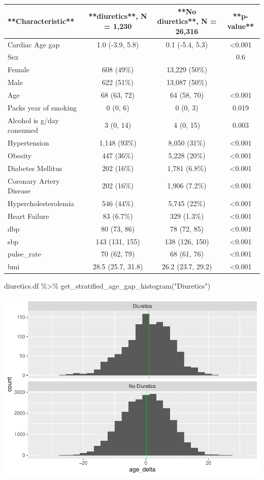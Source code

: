 \documentclass[
]{article}
\newenvironment{Shaded}{\begin{snugshade}}{\end{snugshade}}
\newcommand{\FunctionTok}[1]{\textcolor[rgb]{0.00,0.00,0.00}{#1}}
\newcommand{\NormalTok}[1]{#1}
\newcommand{\SpecialCharTok}[1]{\textcolor[rgb]{0.00,0.00,0.00}{#1}}
\newcommand{\StringTok}[1]{\textcolor[rgb]{0.31,0.60,0.02}{#1}}
\begin{document}
\begin{tabular}{l|c|c|c}
\hline
**Characteristic** & **diuretics**, N = 1,230 & **No diuretics**, N = 26,316 & **p-value**\\
\hline
Cardiac Age gap & 1.0 (-3.9, 5.8) & 0.1 (-5.4, 5.3) & <0.001\\
\hline
Sex &  &  & 0.6\\
\hline
Female & 608 (49\%) & 13,229 (50\%) & \\
\hline
Male & 622 (51\%) & 13,087 (50\%) & \\
\hline
Age & 68 (63, 72) & 64 (58, 70) & <0.001\\
\hline
Packs year of smoking & 0 (0, 6) & 0 (0, 3) & 0.019\\
\hline
Alcohol is g/day consumed & 3 (0, 14) & 4 (0, 15) & 0.003\\
\hline
Hypertension & 1,148 (93\%) & 8,050 (31\%) & <0.001\\
\hline
Obesity & 447 (36\%) & 5,228 (20\%) & <0.001\\
\hline
Diabetes Mellitus & 202 (16\%) & 1,781 (6.8\%) & <0.001\\
\hline
Coronary Artery Disease & 202 (16\%) & 1,906 (7.2\%) & <0.001\\
\hline
Hypercholesterolemia & 546 (44\%) & 5,745 (22\%) & <0.001\\
\hline
Heart Failure & 83 (6.7\%) & 329 (1.3\%) & <0.001\\
\hline
dbp & 80 (73, 86) & 78 (72, 85) & <0.001\\
\hline
sbp & 143 (131, 155) & 138 (126, 150) & <0.001\\
\hline
pulse\_rate & 70 (62, 79) & 68 (61, 76) & <0.001\\
\hline
bmi & 28.5 (25.7, 31.8) & 26.2 (23.7, 29.2) & <0.001\\
\hline
\end{tabular}

\begin{Shaded}
\begin{Highlighting}[]
\NormalTok{diuretics.df }\SpecialCharTok{\%\textgreater{}\%} 
  \FunctionTok{get\_stratified\_age\_gap\_histogram}\NormalTok{(}\StringTok{"Diuretics"}\NormalTok{)}
\end{Highlighting}
\end{Shaded}

\includegraphics{../results/report_files/figure-latex/diuretics-age-gap-histograms-1.pdf}
\end{document}
